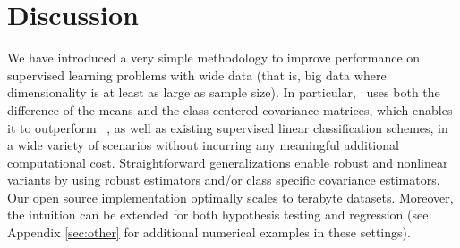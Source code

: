 \documentclass[11pt]{extarticle}
\begin{document}

\section*{Discussion}




We have introduced a very simple methodology to improve performance on supervised learning problems with  wide data (that is, big data where dimensionality is at least as large as sample size).
In particular, \Lol~uses both the difference of the means and the class-centered covariance matrices, which enables it to outperform \Pca~, as well as existing supervised linear classification schemes, in a wide variety of scenarios without incurring any meaningful additional computational cost. Straightforward generalizations enable robust and nonlinear variants by using robust estimators and/or class specific covariance estimators.
Our open source implementation optimally scales to terabyte datasets. Moreover, the intuition can be extended for both hypothesis testing and regression  (see Appendix \ref{sec:other} for additional numerical examples in these settings).
\end{document}
